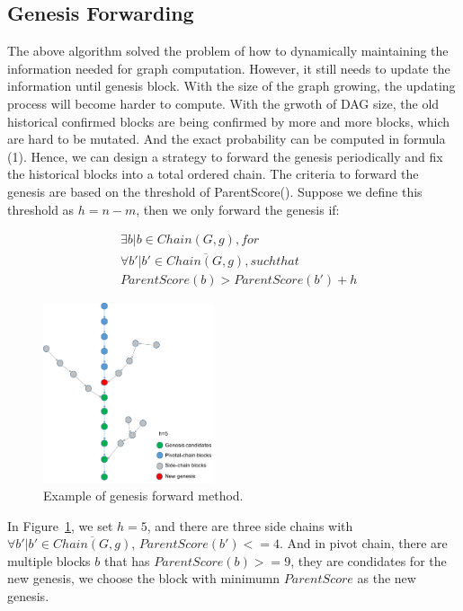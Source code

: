 \subsection{Genesis Forwarding}
The above algorithm solved the problem of how to dynamically maintaining the information needed for graph computation.
However, it still needs to update the information until genesis block. 
With the size of the graph growing, the updating process will become harder to compute.
With the grwoth of DAG size, the old historical confirmed blocks are being confirmed by more and more blocks, 
which are hard to be mutated.
And the exact probability can be computed in formula (1).
Hence, we can design a strategy to forward the genesis periodically and fix the historical blocks into a total ordered chain.
The criteria to forward the genesis are based on the threshold of ParentScore().
Suppose we define this threshold as $h = n-m $, then we only forward the genesis if: 

\begin{equation}
    \begin{flalign*}
        & \exists b | b \in Chain(G, g), for \\ 
        & \forall b' | b' \in \overline{Chain(G,g)}, such that \\
        & ParentScore(b) > ParentScore(b') + h 
    \end{flalign*}
\end{equation}

\begin{figure}[!ht]
\begin{center}
\includegraphics[width=0.45\textwidth]{figures/genesis_forward.pdf}
    \caption{
        Example of genesis forward method. 
     }
\label{genesis_forward}
\end{center}
\end{figure}

In Figure~\ref{genesis_forward}, we set $h=5$, and there are three side chains with $\forall b' | b' \in \overline{Chain(G,g)}$, $ParentScore(b')<=4$.
And in pivot chain, there are multiple blocks $b$ that has $ParentScore(b) >= 9$, they are condidates for the new genesis, 
we choose the block with minimumn $ParentScore$ as the new genesis.

